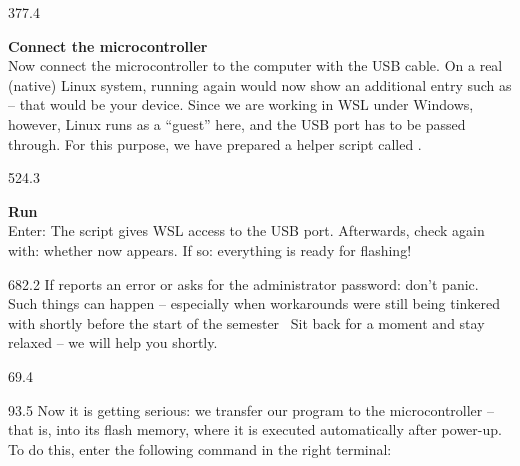 \documentclass{aslab}
\begin{document}
\begin{region}{377.4}
\begin{tasks}[start=2]
\item \textbf{Connect the microcontroller}\\
  Now connect the microcontroller to the computer with the USB cable. On a
  real (native) Linux system, running
  \blank
  \blank
  again would now show an additional entry such as  --
  that would be your device.
  \blank
  Since we are working in WSL under Windows, however, Linux runs as a
  ``guest'' here, and the USB port has to be passed through. For this
  purpose, we have prepared a helper script called .
\end{tasks}
\end{region}

\begin{region}{524.3}
\begin{tasks}[start=3]
\item \textbf{Run }\\
  Enter:
  \blank
  \blank
  The script gives WSL access to the USB port. Afterwards, check again
  with:
  \blank
  \blank
  whether  now appears. If so: everything is ready for
  flashing!
\end{tasks}
\end{region}

\begin{region}{682.2}
If  reports an error or asks for the administrator password:
don't panic. Such things can happen -- especially when workarounds were
still being tinkered with shortly before the start of the semester
\ Sit back for a moment and stay relaxed -- we will help you
shortly.
\end{region}

\nextpage
\begin{region}{69.4}
\end{region}

\begin{region}{93.5}
Now it is getting serious: we transfer our program to the microcontroller
-- that is, into its flash memory, where it is executed automatically after
power-up.\\
To do this, enter the following command in the right terminal:
\end{region}
\end{document}
